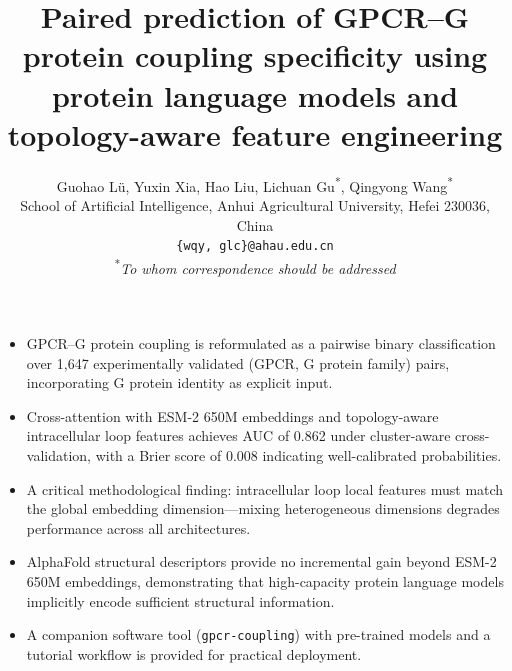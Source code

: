 \documentclass[11pt,a4paper]{article}
\title{\LARGE \bfseries Paired prediction of GPCR--G protein coupling specificity using protein language models and topology-aware feature engineering}
\author{
  Guohao L\"{u}, Yuxin Xia, Hao Liu, Lichuan Gu\textsuperscript{*}, Qingyong Wang\textsuperscript{*} \\
  \small School of Artificial Intelligence, Anhui Agricultural University, Hefei 230036, China \\
  \small \texttt{\{wqy, glc\}@ahau.edu.cn} \\
  \small \textsuperscript{*}\textit{To whom correspondence should be addressed}
}
\date{}
\begin{document}
\linenumbers

\maketitle

\begin{tcolorbox}[
  title=\textbf{Key Points},
  colback=blue!3!white,
  colframe=blue!30!white,
  coltitle=black,
  fonttitle=\bfseries,
  sharp corners
]
\begin{itemize}[leftmargin=*,itemsep=4pt]
  \item GPCR--G protein coupling is reformulated as a pairwise binary classification over 1,647 experimentally validated (GPCR, G protein family) pairs, incorporating G protein identity as explicit input.
  \item Cross-attention with ESM-2 650M embeddings and topology-aware intracellular loop features achieves AUC of 0.862 under cluster-aware cross-validation, with a Brier score of 0.008 indicating well-calibrated probabilities.
  \item A critical methodological finding: intracellular loop local features must match the global embedding dimension---mixing heterogeneous dimensions degrades performance across all architectures.
  \item AlphaFold structural descriptors provide no incremental gain beyond ESM-2 650M embeddings, demonstrating that high-capacity protein language models implicitly encode sufficient structural information.
  \item A companion software tool (\texttt{gpcr-coupling}) with pre-trained models and a tutorial workflow is provided for practical deployment.
\end{itemize}
\end{tcolorbox}

\vspace{6pt}
\end{document}
